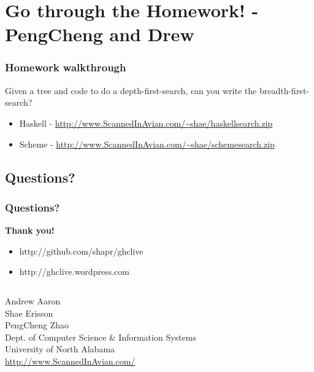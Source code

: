 \documentclass[xcolor=pdftex,dvipsnames,table]{beamer}
\begin{document}
\section{Go through the Homework! - PengCheng and Drew}
\begin{frame}
  \frametitle{Homework walkthrough}
  Given a tree and code to do a depth-first-search, can you write the breadth-first-search?
  \begin{itemize}
  \item Haskell - \url{http://www.ScannedInAvian.com/~shae/haskellsearch.zip}
  \item Scheme - \url{http://www.ScannedInAvian.com/~shae/schemesearch.zip}
  \end{itemize}
\end{frame}

\subsection{Questions?}
\begin{frame}[plain]
  \label{thanks}
  \frametitle{Questions?}
  \begin{center}
    \textbf{Thank you!}
  \end{center}
  \begin{itemize}
  \item http://github.com/shapr/ghclive
  \item http://ghclive.wordpress.com
  \end{itemize}
  \vspace{0.5cm}
  \begin{center}
    \begin{minipage}{11cm}
      \begin{columns}[c]
        Andrew Aaron\\
        Shae Erisson\\
        PengCheng Zhao\\
        Dept. of Computer Science \& Information Systems\\
        University of North Alabama\\
        \url{http://www.ScannedInAvian.com/}
      \end{columns}
    \end{minipage}
  \end{center}
\end{frame}


\end{document}
